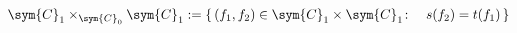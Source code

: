 \begin{equation}
  \sym{C}_1\times_{\sym{C}_0}\sym{C}_1:=\{\,(f_1,f_2)\in\sym{C}_1\times\sym{C}_1\colon\quad
    s(f_2)=t(f_1)\,\}
\end{equation}

